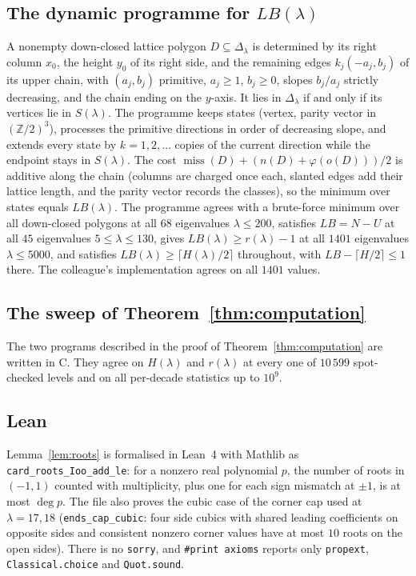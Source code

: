\documentclass[11pt]{amsart}
\theoremstyle{definition}
\theoremstyle{remark}
\newcommand{\Z}{\mathbb{Z}}
\newcommand{\miss}{\operatorname{miss}}
\newcommand{\SweepX}{10^9}
\numberwithin{equation}{section}
\begin{document}
\subsection*{\texorpdfstring{The dynamic programme for $LB(\lambda)$}{The dynamic programme for LB}}
A nonempty down-closed lattice polygon $D\subseteq\Delta_\lambda$ is determined by its right
column $x_0$, the height $y_0$ of its right side, and the remaining edges $k_j(-a_j,b_j)$ of its
upper chain, with $(a_j,b_j)$ primitive, $a_j\ge1$, $b_j\ge0$, slopes $b_j/a_j$ strictly
decreasing, and the chain ending on the $y$-axis. It lies in $\Delta_\lambda$ if and only if its
vertices lie in $S(\lambda)$. The programme keeps states (vertex, parity vector in $(\Z/2)^3$),
processes the primitive directions in order of decreasing slope, and extends every state by
$k=1,2,\dots$ copies of the current direction while the endpoint stays in $S(\lambda)$. The cost
$\miss(D)+(n(D)+\varphi(o(D)))/2$ is additive along the chain (columns are charged once each,
slanted edges add their lattice length, and the parity vector records the classes), so the
minimum over states equals $LB(\lambda)$. The programme agrees with a brute-force minimum over
all down-closed polygons at all $68$ eigenvalues $\lambda\le200$, satisfies $LB=N-U$ at all $45$
eigenvalues $5\le\lambda\le130$, gives $LB(\lambda)\ge r(\lambda)-1$ at all $1401$ eigenvalues
$\lambda\le5000$, and satisfies $LB(\lambda)\ge\lceil H(\lambda)/2\rceil$ throughout, with
$LB-\lceil H/2\rceil\le1$ there. The colleague's implementation agrees on all $1401$
values.

\subsection*{The sweep of Theorem~\ref{thm:computation}}
The two programs described in the proof of Theorem~\ref{thm:computation} are written in C. They
agree on $H(\lambda)$ and $r(\lambda)$ at every one of $10\,599$ spot-checked levels and on all
per-decade statistics up to $\SweepX$.

\subsection*{Lean}
Lemma~\ref{lem:roots} is formalised in Lean~4 with Mathlib as
\texttt{card\_roots\_Ioo\_add\_le}: for a nonzero real polynomial $p$, the number of roots in
$(-1,1)$ counted with multiplicity, plus one for each sign mismatch at $\pm1$, is at most
$\deg p$. The file also proves the cubic case of the corner cap used at $\lambda=17,18$
(\texttt{ends\_cap\_cubic}: four side cubics with shared leading coefficients on opposite sides
and consistent nonzero corner values have at most $10$ roots on the open sides). There is no
\texttt{sorry}, and \texttt{\#print axioms} reports only \texttt{propext},
\texttt{Classical.choice} and \texttt{Quot.sound}.
\end{document}
